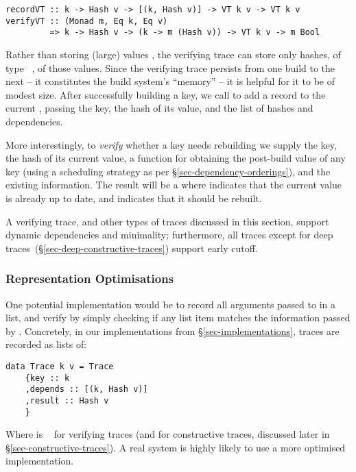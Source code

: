 \begin{verbatim}
recordVT :: k -> Hash v -> [(k, Hash v)] -> VT k v -> VT k v
verifyVT :: (Monad m, Eq k, Eq v)
         => k -> Hash v -> (k -> m (Hash v)) -> VT k v -> m Bool
\end{verbatim}

\noindent
Rather than storing (large) values , the verifying trace  can store
only hashes, of type ~, of those values. Since the verifying
trace persists from one build to the next -- it constitutes the build system's
``memory'' -- it is helpful for it to be of modest size. After successfully
building a key, we call  to add a record to the current ,
passing the key, the hash of its value, and the list of hashes and dependencies.

More interestingly, to \emph{verify} whether a key needs rebuilding we supply
the key, the hash of its current value, a function for obtaining the post-build
value of any key (using a scheduling strategy as per
\S\ref{sec-dependency-orderings}), and the existing  information. The
result will be a  where  indicates that the current value is
already up to date, and  indicates that it should be rebuilt.

A verifying trace, and other types of traces discussed in this section, support
dynamic dependencies and minimality; furthermore, all traces except for deep
traces~(\S\ref{sec-deep-constructive-traces}) support early cutoff.

\subsubsection{Representation Optimisations}

One potential implementation would be to record all arguments passed to
 in a list, and verify by simply checking if any list item matches
the information passed by . Concretely,
in our implementations from \S\ref{sec-implementations}, traces are recorded as lists of:

\begin{verbatim}
data Trace k v = Trace
    {key :: k
    ,depends :: [(k, Hash v)]
    ,result :: Hash v
    }
\end{verbatim}

\noindent Where  is ~ for verifying traces (and  for constructive traces, discussed later in \S\ref{sec-constructive-traces}). A real system is highly likely to use a more optimised implementation.

